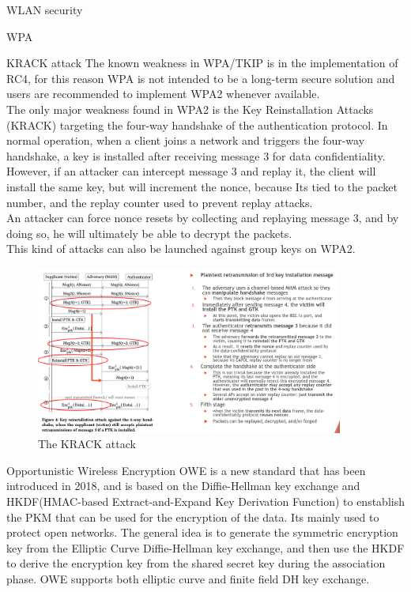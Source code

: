 \begin{section}{WLAN security}
\begin{subsection}{WPA}
    \begin{subsubsection}{KRACK attack}
      The known weakness in WPA/TKIP is in the implementation of RC4, for this reason 
      WPA is not intended to be a long-term secure solution and users are recommended to 
      implement WPA2 whenever available.\\
      The only major weakness found in WPA2 is the Key Reinstallation Attacks (KRACK) targeting 
      the four-way handshake of the authentication protocol. In normal operation, when a client 
      joins a network and triggers the four-way handshake, a key is installed after receiving 
      message 3 for data confidentiality. However, if an attacker can intercept message 3 and
      replay it, the client will install the same key, but will increment the nonce, because Its
      tied to the packet number, and the replay counter used to prevent replay attacks.\\
      An attacker can force nonce resets by collecting and replaying message 3, and by doing so,
      he will ultimately be able to decrypt the packets.\\
      This kind of attacks can also be launched against group keys on WPA2.
      \begin{figure}[h]
        \centering
        \includegraphics[width=0.9\textwidth]{img/wireless/KRAC attack.png}
        \caption{The KRACK attack}
      \end{figure}
    \end{subsubsection}

    \begin{subsubsection}{Opportunistic Wireless Encryption}
      OWE is a new standard that has been introduced in 2018, and is based on the Diffie-Hellman
      key exchange and HKDF(HMAC-based Extract-and-Expand Key Derivation Function) to enstablish
      the PKM that can be used for the encryption of the data. Its mainly used to protect open networks.
      The general idea is to generate the symmetric encryption key from the Elliptic Curve Diffie-Hellman
      key exchange, and then use the HKDF to derive the encryption key from the shared secret key 
      during the association phase. OWE supports both elliptic curve and finite field DH key exchange.


\end{subsubsection}
\end{subsection}
\end{section}
